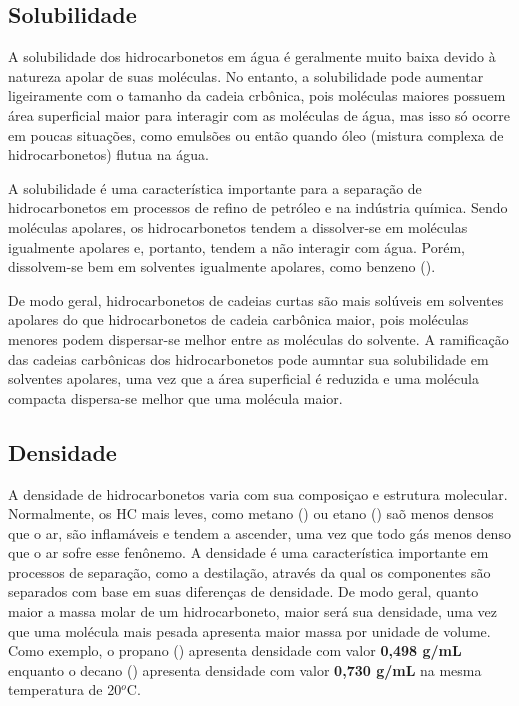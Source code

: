 \subsection{Solubilidade}

A solubilidade dos hidrocarbonetos em água é geralmente muito baixa devido à natureza apolar de suas moléculas. No entanto, a solubilidade pode aumentar ligeiramente com o tamanho da cadeia crbônica, pois moléculas maiores possuem área superficial maior para interagir com as moléculas de água, mas isso só ocorre em poucas situações, como emulsões ou então quando óleo (mistura complexa de hidrocarbonetos) flutua na água.

A solubilidade é uma característica importante para a separação de hidrocarbonetos em processos de refino de petróleo e na indústria química. Sendo moléculas apolares, os hidrocarbonetos tendem a dissolver-se em moléculas igualmente apolares e, portanto, tendem a não interagir com água. Porém, dissolvem-se bem em solventes igualmente apolares, como benzeno ().

De modo geral, hidrocarbonetos de cadeias curtas são mais solúveis em solventes apolares do que hidrocarbonetos de cadeia carbônica maior, pois moléculas menores podem dispersar-se melhor entre as moléculas do solvente. A ramificação das cadeias carbônicas dos hidrocarbonetos pode aumntar sua solubilidade em solventes apolares, uma vez que a área superficial é reduzida e uma molécula compacta dispersa-se melhor que uma molécula maior.

 

\subsection{Densidade}
A densidade de hidrocarbonetos varia com sua composiçao e estrutura molecular. Normalmente, os HC mais leves, como metano () ou etano () saõ menos densos que o ar, são inflamáveis e tendem a ascender, uma vez que todo gás menos denso que o ar sofre esse fenônemo. A densidade é uma característica  importante em processos de separação, como a destilação, através da qual os componentes são separados com base em suas diferenças de densidade. De modo geral, quanto maior a massa molar de um hidrocarboneto, maior será sua densidade, uma vez que uma molécula mais pesada apresenta maior massa por unidade de volume. Como exemplo, o propano () apresenta densidade com valor \textbf{0,498 g/mL} enquanto o decano () apresenta densidade com valor \textbf{0,730 g/mL} na mesma temperatura de 20{$^o$}C.

